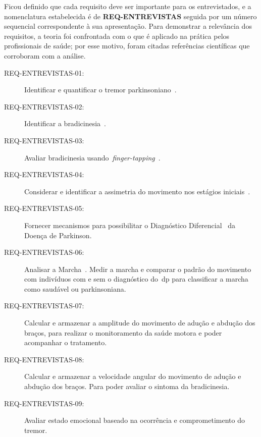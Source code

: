 Ficou definido que cada requisito deve ser importante para os entrevistados, e a nomenclatura estabelecida é de \textbf{REQ-ENTREVISTAS} seguida por um número sequencial correspondente à sua apresentação. Para demonstrar a relevância dos requisitos, a teoria foi confrontada com o que é aplicado na prática pelos profissionais de saúde; por esse motivo, foram citadas referências científicas que corroboram com a análise. 

\begin{description}
	\item[REQ-ENTREVISTAS-01:] Identificar e quantificar o tremor parkinsoniano~\cite{tolosa06,keijsers2006,lemoyne2010}.
	\item[REQ-ENTREVISTAS-02:] Identificar a bradicinesia~\cite{patel_monitoring_2009}. %
	\item[REQ-ENTREVISTAS-03:] Avaliar bradicinesia usando~\textit{finger-tapping}~\cite{finger2012}.
	\item[REQ-ENTREVISTAS-04:] Considerar e identificar a assimetria do movimento nos estágios iniciais~\cite{national2006parkinson}.	%
	\item[REQ-ENTREVISTAS-05:] Fornecer mecanismos para possibilitar o Diagnóstico Diferencial~\cite{protpar010} da Doença de Parkinson. %
	\item[REQ-ENTREVISTAS-06:] Analisar a Marcha~\cite{gaitusingsensorsreview2012}. Medir a marcha e comparar o padrão do movimento com indivíduos com e sem o diagnóstico do~\ac{dp} para classificar a marcha como saudável ou parkinsoniana.
	\item[REQ-ENTREVISTAS-07:] Calcular e armazenar a amplitude do movimento de adução e abdução dos braços, para realizar o monitoramento da saúde motora e poder acompanhar o tratamento.
	\item[REQ-ENTREVISTAS-08:] Calcular e armazenar a velocidade angular do movimento de adução e abdução dos braços. Para poder avaliar o sintoma da bradicinesia.
	\item[REQ-ENTREVISTAS-09:] Avaliar estado emocional baseado na ocorrência e comprometimento do tremor. 
\end{description}



